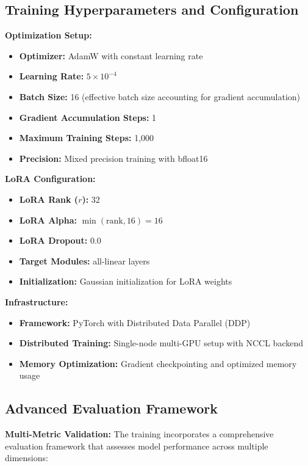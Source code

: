 \subsection{Training Hyperparameters and Configuration}

\textbf{Optimization Setup:}
\begin{itemize}
    \item \textbf{Optimizer:} AdamW with constant learning rate
    \item \textbf{Learning Rate:} $5 \times 10^{-4}$
    \item \textbf{Batch Size:} 16 (effective batch size accounting for gradient accumulation)
    \item \textbf{Gradient Accumulation Steps:} 1
    \item \textbf{Maximum Training Steps:} 1,000
    \item \textbf{Precision:} Mixed precision training with bfloat16
\end{itemize}

\textbf{LoRA Configuration:}
\begin{itemize}
    \item \textbf{LoRA Rank ($r$):} 32
    \item \textbf{LoRA Alpha:} $\min(\text{rank}, 16) = 16$
    \item \textbf{LoRA Dropout:} 0.0
    \item \textbf{Target Modules:} all-linear layers
    \item \textbf{Initialization:} Gaussian initialization for LoRA weights
\end{itemize}

\textbf{Infrastructure:}
\begin{itemize}
    \item \textbf{Framework:} PyTorch with Distributed Data Parallel (DDP)
    \item \textbf{Distributed Training:} Single-node multi-GPU setup with NCCL backend
    \item \textbf{Memory Optimization:} Gradient checkpointing and optimized memory usage
\end{itemize}

\subsection{Advanced Evaluation Framework}

\textbf{Multi-Metric Validation:} The training incorporates a comprehensive evaluation framework that assesses model performance across multiple dimensions:

